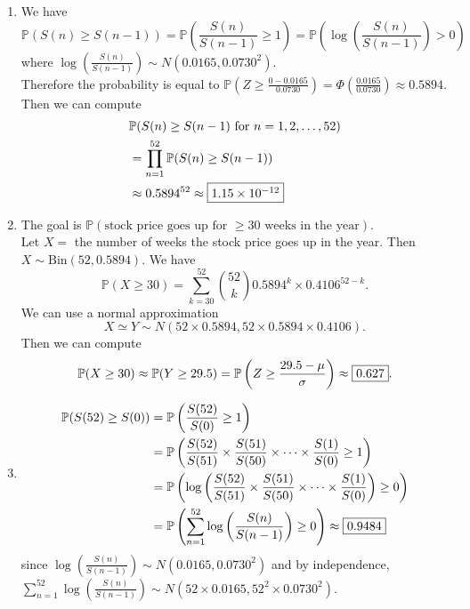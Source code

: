 \documentclass[a4paper,11pt]{amsbook}
\theoremstyle{definition}
\theoremstyle{remark}
\renewcommand{\P}{\mathbb{P}}
\newcommand\0{\varnothing}
\newcommand\Bin{\text{Bin}}
\begin{document}
    \begin{enumerate}
        \item We have $$\P(S(n)\geq S(n-1))=\P\left(\frac{S(n)}{S(n-1)}\geq1\right)=\P\left(\log\left(\frac{S(n)}{S(n-1)}\right)>0\right)$$
        where $\log\left(\frac{S(n)}{S(n-1)}\right)\sim N(0.0165,0.0730^2)$.\\
        Therefore the probability is equal to $\P\left(Z\geq\frac{0-0.0165}{0.0730}\right)=\Phi\left(\frac{0.0165}{0.0730}\right)\approx0.5894$.\\
        Then we can compute
        \begin{align*}
            &\P(S(n)\geq S(n-1)\text{ for }n=1,2,\ldots,52) \\
            &=\prod_{n=1}^{52}\P(S(n)\geq S(n-1)) \\
            &\approx0.5894^{52}\approx\fbox{$1.15\times10^{-12}$}
        \end{align*}
        \item The goal is $\P(\text{stock price goes up for $\geq30$ weeks in the year})$.\\
        Let $X=$ the number of weeks the stock price goes up in the year. Then $X\sim\Bin(52,0.5894)$.
        We have 
        $$\P(X\geq30)=\sum_{k=30}^{52}\binom{52}{k}0.5894^k\times0.4106^{52-k}.$$
        We can use a normal approximation $$X\simeq Y\sim N(52\times0.5894,52\times0.5894\times0.4106).$$
        Then we can compute
        $$\P(X\geq30)\approx\P(Y\geq29.5)=\P\left(Z\geq\frac{29.5-\mu}{\sigma}\right)\approx\fbox{0.627}.$$
        \item \begin{align*}
            \P(S(52)\geq S(0))&=\P\left(\frac{S(52)}{S(0)}\geq1\right) \\
            &=\P\left(\frac{S(52)}{S(51)}\times\frac{S(51)}{S(50)}\times\cdots\times\frac{S(1)}{S(0)}\geq1\right) \\
            &=\P\left(\log\left(\frac{S(52)}{S(51)}\times\frac{S(51)}{S(50)}\times\cdots\times\frac{S(1)}{S(0)}\right)\geq0\right) \\
            &=\P\left(\sum_{n=1}^{52}\log\left(\frac{S(n)}{S(n-1)}\right)\geq0\right)\approx\fbox{0.9484}
        \end{align*}
        since $\log\left(\frac{S(n)}{S(n-1)}\right)\sim N(0.0165,0.0730^2)$ and by independence, 
        $\sum_{n=1}^{52}\log\left(\frac{S(n)}{S(n-1)}\right)\sim N(52\times0.0165,52^2\times0.0730^2)$.
    \end{enumerate}
\end{document}

